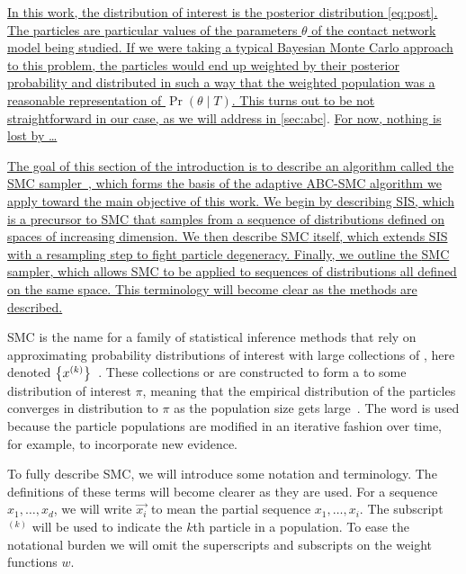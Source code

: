 {{\uline{In this work, the distribution of interest is the posterior distribution
\ref{eq:post}. The particles are particular values of the parameters $\theta$
of the contact network model being studied. If we were taking a typical
Bayesian Monte Carlo approach to this problem, the particles would end up
weighted by their posterior probability and distributed in such a way that the
weighted population was a reasonable representation of $\Pr(\theta \mid T)$.
This turns out to be not straightforward in our case, as we will address in
}\cref{sec:abc}. \uline{For now, nothing is lost by \ldots}}

{\color{blue}\uline{
The goal of this section of the introduction is to describe an algorithm called
the \gls{SMC} sampler~\autocite{del2006sequential}, which forms the basis of
the adaptive \gls{ABC}-\gls{SMC} algorithm we apply toward the main objective
of this work. We begin by describing \gls{SIS}, which is a precursor to
\gls{SMC} that samples from a sequence of distributions defined on spaces of
increasing dimension. We then describe \gls{SMC} itself, which extends
\gls{SIS} with a resampling step to fight particle degeneracy. Finally, we
outline the \gls{SMC} sampler, which allows \gls{SMC} to be applied to
sequences of distributions all defined on the same space. This terminology will
become clear as the methods are described.
}}

\Gls{SMC} is the name for a family of statistical inference methods that rely
on approximating probability distributions of interest with large collections
of , here denoted
$\left\lbrace x^{(k)}\right\rbrace$~\autocite{doucet2000sequential, doucet2001introduction,
liu2008monte}. These collections or  are constructed to form
a  to some distribution of interest $\pi$,
meaning that the empirical distribution of the particles converges in
distribution to $\pi$ as the population size gets
large~\autocite{liu2001theoretical}. The word  is used because
the particle populations are modified in an iterative fashion over time, for
example, to incorporate new evidence. 

To fully describe \gls{SMC}, we will introduce some notation and terminology.
The definitions of these terms will become clearer as they are used. For a
sequence $x_1, \ldots, x_d$, we will write $\vec{x_i}$ to mean the partial
sequence $x_1, \ldots, x_i$. The subscript $^{(k)}$ will be used to indicate
the $k$th particle in a population. To ease the notational burden we will omit
the superscripts and subscripts on the weight functions $w$.

}
